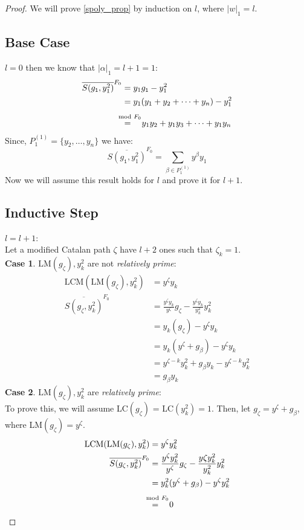 \documentclass[12pt,reqno]{amsart}
\theoremstyle{plain}
\theoremstyle{definition}
\begin{document}
\begin{proof} 
	We will prove \ref{spoly_prop} by induction on $l$, where $|w|_1 = l$. 
	\subsection*{Base Case} $l = 0$ then we know that $|\alpha|_1 = l + 1 = 1$:
	\begin{align*}
		\overline{S(g_{\texttt{1}}, y^2_1)}^{F_0} &= y_1g_{\texttt{1}} - y^2_1 \\
										  &= y_1(y_1 + y_2 + \dots + y_n) - y^2_1 \\
										  &\overset{\mathclap{\strut \mod F_0}} = \hspace{1 em} y_1y_2 + y_1y_3 + \dots + y_1y_n
	\end{align*}
	Since, $P^{(1)}_{1} = \{ y_2, \dots, y_n\}$ we have:
	\begin{equation*}
		\overline{S(g_{\texttt{1}}, y^2_1)}^{F_0} = \sum_{\beta \in P^{(1)}_{1}} y^{\beta}y_1
	\end{equation*}
	Now we will assume this result holds for $l$ and prove it for $l+1$. 
	\subsection*{Inductive Step} $l = l+1$: \\
	Let a modified Catalan path $\zeta$ have $l + 2$ ones such that $\zeta_{k} = 1$. \\ 
	\textbf{Case 1}. $\text{LM}(g_\zeta), y_k^2$ are not \textit{relatively prime}: 
	\begin{align*}
		\text{LCM}(\text{LM}(g_\zeta), y_k^2) 	&= y^{\zeta} y_k \\
		\overline{S(g_{\zeta}, y^2_k)}^{F_0} 	&= \frac{y^{\zeta} y_k}{y^\zeta} g_{\zeta} - \frac{y^{\zeta} y_k}{y^2_k} y^2_k \\
										  		&= y_k(g_{\zeta}) - y^{\zeta} y_k \\
												&= y_k(y^{\zeta} + g_{\beta}) - y^{\zeta} y_k \\
												&= y^{\zeta - k} y^2_k + g_{\beta}y_k - y^{\zeta-k} y_k^2 \\
												&= g_{\beta}y_k
	\end{align*}
	\textbf{Case 2}. $\text{LM}(g_\zeta), y_k^2$ are \textit{relatively prime}: \\
	To prove this, we will assume LC$(g_\zeta)$ = LC$(y^2_k) = 1$. Then, let $g_\zeta = y^{\zeta} + g_\beta$, where 
	LM$(g_\zeta) = y^{\zeta}$.
	\begin{align*}
		\text{LCM}(\text{LM}(g_\zeta), y_k^2) 	&= y^{\zeta}y^2_k \\
		\overline{S(g_{\zeta}, y^2_k)}^{F_0} 	&= \frac{y^{\zeta}y^2_k}{y^{\zeta}} g_{\zeta} - \frac{y{\zeta}y^2_k}{y^2_k} y^2_k \\
												&= y^2_k(y^{\zeta} + g_{\beta}) - y^{\zeta}y^2_k \\
												&\overset{\mathclap{\strut \mod F_0}} = \hspace*{1em} 0
	\end{align*}
\end{proof}
\end{document}

